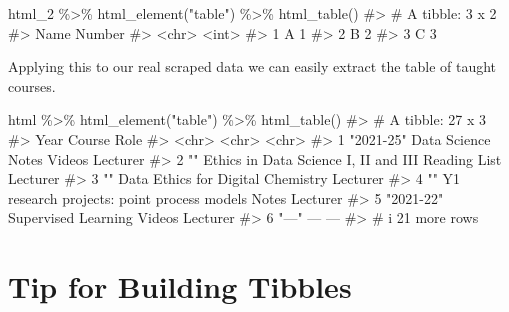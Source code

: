 \documentclass[
  letterpaper,
  DIV=11,
  numbers=noendperiod]{scrreprt}
\newenvironment{Shaded}{\begin{snugshade}}{\end{snugshade}}
\newcommand{\CommentTok}[1]{\textcolor[rgb]{0.37,0.37,0.37}{#1}}
\newcommand{\FunctionTok}[1]{\textcolor[rgb]{0.28,0.35,0.67}{#1}}
\newcommand{\NormalTok}[1]{\textcolor[rgb]{0.00,0.23,0.31}{#1}}
\newcommand{\SpecialCharTok}[1]{\textcolor[rgb]{0.37,0.37,0.37}{#1}}
\newcommand{\StringTok}[1]{\textcolor[rgb]{0.13,0.47,0.30}{#1}}
\begin{document}
\begin{Shaded}
\begin{Highlighting}[]
\NormalTok{html\_2 }\SpecialCharTok{\%\textgreater{}\%} 
  \FunctionTok{html\_element}\NormalTok{(}\StringTok{"table"}\NormalTok{) }\SpecialCharTok{\%\textgreater{}\%} 
  \FunctionTok{html\_table}\NormalTok{()}
\CommentTok{\#\textgreater{} \# A tibble: 3 x 2}
\CommentTok{\#\textgreater{}   Name  Number}
\CommentTok{\#\textgreater{}   \textless{}chr\textgreater{}  \textless{}int\textgreater{}}
\CommentTok{\#\textgreater{} 1 A          1}
\CommentTok{\#\textgreater{} 2 B          2}
\CommentTok{\#\textgreater{} 3 C          3}
\end{Highlighting}
\end{Shaded}

Applying this to our real scraped data we can easily extract the table
of taught courses.

\begin{Shaded}
\begin{Highlighting}[]
\NormalTok{html }\SpecialCharTok{\%\textgreater{}\%} 
  \FunctionTok{html\_element}\NormalTok{(}\StringTok{"table"}\NormalTok{) }\SpecialCharTok{\%\textgreater{}\%} 
  \FunctionTok{html\_table}\NormalTok{()}
\CommentTok{\#\textgreater{} \# A tibble: 27 x 3}
\CommentTok{\#\textgreater{}   Year      Course                                            Role    }
\CommentTok{\#\textgreater{}   \textless{}chr\textgreater{}     \textless{}chr\textgreater{}                                             \textless{}chr\textgreater{}   }
\CommentTok{\#\textgreater{} 1 "2021{-}25" Data Science Notes Videos                         Lecturer}
\CommentTok{\#\textgreater{} 2 ""        Ethics in Data Science I, II and III Reading List Lecturer}
\CommentTok{\#\textgreater{} 3 ""        Data Ethics for Digital Chemistry                 Lecturer}
\CommentTok{\#\textgreater{} 4 ""        Y1 research projects: point process models Notes  Lecturer}
\CommentTok{\#\textgreater{} 5 "2021{-}22" Supervised Learning Videos                        Lecturer}
\CommentTok{\#\textgreater{} 6 "—"       —                                                 —       }
\CommentTok{\#\textgreater{} \# i 21 more rows}
\end{Highlighting}
\end{Shaded}

\section{Tip for Building Tibbles}\label{tip-for-building-tibbles}
\end{document}

